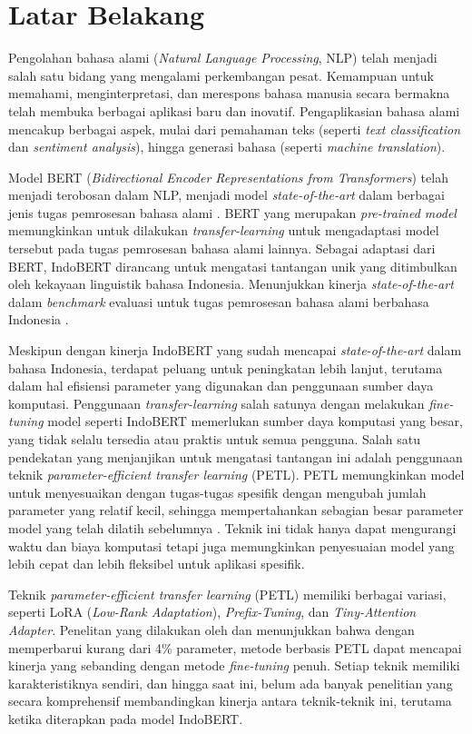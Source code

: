 \section{Latar Belakang}
\label{sec:latar-belakang}

Pengolahan bahasa alami (\textit{Natural Language Processing}, NLP) telah menjadi salah satu bidang yang mengalami perkembangan pesat. Kemampuan untuk memahami, menginterpretasi, dan merespons bahasa manusia secara bermakna telah membuka berbagai aplikasi baru dan inovatif. Pengaplikasian bahasa alami mencakup berbagai aspek, mulai dari pemahaman teks (seperti \textit{text classification} dan \textit{sentiment analysis}), hingga generasi bahasa (seperti \textit{machine translation}).

Model BERT (\textit{Bidirectional Encoder Representations from Transformers}) telah menjadi terobosan dalam NLP, menjadi model \textit{state-of-the-art} dalam berbagai jenis tugas pemrosesan bahasa alami \parencite{bert}. BERT yang merupakan \textit{pre-trained model} memungkinkan untuk dilakukan \textit{transfer-learning} untuk mengadaptasi model tersebut pada tugas pemrosesan bahasa alami lainnya. Sebagai adaptasi dari BERT, IndoBERT dirancang untuk mengatasi tantangan unik yang ditimbulkan oleh kekayaan linguistik bahasa Indonesia. Menunjukkan kinerja \textit{state-of-the-art} dalam \textit{benchmark} evaluasi untuk tugas pemrosesan bahasa alami berbahasa Indonesia \parencite{indobert}.

Meskipun dengan kinerja IndoBERT yang sudah mencapai \textit{state-of-the-art} dalam bahasa Indonesia, terdapat peluang untuk peningkatan lebih lanjut, terutama dalam hal efisiensi parameter yang digunakan dan penggunaan sumber daya komputasi. Penggunaan \textit{transfer-learning} salah satunya dengan melakukan \textit{fine-tuning} model seperti IndoBERT memerlukan sumber daya komputasi yang besar, yang tidak selalu tersedia atau praktis untuk semua pengguna. Salah satu pendekatan yang menjanjikan untuk mengatasi tantangan ini adalah penggunaan teknik \textit{parameter-efficient transfer learning} (PETL). PETL memungkinkan model untuk menyesuaikan dengan tugas-tugas spesifik dengan mengubah jumlah parameter yang relatif kecil, sehingga mempertahankan sebagian besar parameter model yang telah dilatih sebelumnya \parencite{adapter}. Teknik ini tidak hanya dapat mengurangi waktu dan biaya komputasi tetapi juga memungkinkan penyesuaian model yang lebih cepat dan lebih fleksibel untuk aplikasi spesifik. 

Teknik \textit{parameter-efficient transfer learning} (PETL) memiliki berbagai variasi, seperti LoRA (\textit{Low-Rank Adaptation}), \textit{Prefix-Tuning}, dan \textit{Tiny-Attention Adapter}. Penelitan yang dilakukan oleh \citeauthor{adapter} \parencite{adapter} dan \citeauthor{uvpl} \parencite{uvpl} menunjukkan bahwa dengan memperbarui kurang dari 4\% parameter, metode berbasis PETL dapat mencapai kinerja yang sebanding dengan metode \textit{fine-tuning} penuh. Setiap teknik memiliki karakteristiknya sendiri, dan hingga saat ini, belum ada banyak penelitian yang secara komprehensif membandingkan kinerja antara teknik-teknik ini, terutama ketika diterapkan pada model IndoBERT. 

